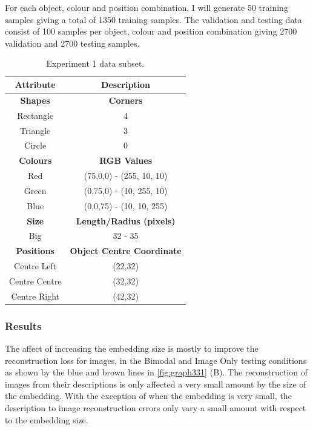 For each object, colour and position combination, I will generate 50 training samples giving a total of 1350 training samples. The validation and testing data consist of 100 samples per object, colour and position combination giving 2700 validation and 2700 testing samples.

\begin{table}[h]
\centering
\begin{tabular}{|c|c|}
\hline
\textbf{Attribute} & \textbf{Description} \\ \hline \hline
\textbf{Shapes} & \textbf{Corners} \\ \hline
Rectangle & 4\\ \hline
Triangle & 3\\ \hline
Circle & 0\\ \hline 

\textbf{Colours} & \textbf{RGB Values}	\\ \hline	
Red & (75,0,0) - (255, 10, 10)\\ \hline
Green  & (0,75,0) - (10, 255, 10)\\ \hline
Blue   & (0,0,75) - (10, 10, 255)\\ \hline


\textbf{Size} & 	\textbf{Length/Radius (pixels)} \\ \hline			  
Big    & 32 - 35  \\ \hline


\textbf{Positions} & \textbf{Object Centre Coordinate}	\\ \hline				  
Centre Left &(22,32)\\ \hline
Centre Centre & (32,32)\\ \hline
Centre Right &(42,32)\\ \hline
				
\end{tabular}
\caption{Experiment 1 data subset.}
\label{tab:exp1_data} 
\end{table}

\subsubsection{Results}

The affect of increasing the embedding size is mostly to improve the reconstruction loss for images, in the Bimodal and Image Only testing conditions as shown by the blue and brown lines in \autoref{fig:graph331} (B). The reconstruction of images from their descriptions is only affected a very small amount by the size of the embedding. With the exception of when the embedding is very small, the description to image reconstruction errors only vary a small amount with respect to the embedding size. 

